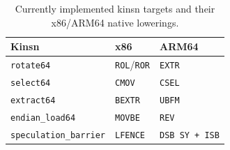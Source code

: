 \begin{table}[t]
\centering
\small
\setlength{\tabcolsep}{4pt}
\begin{tabular}{p{} p{} p{}}
\toprule
\textbf{Kinsn} & \textbf{x86} & \textbf{ARM64} \\
\midrule
\texttt{rotate64} & \texttt{ROL}/\texttt{ROR} & \texttt{EXTR} \\
\texttt{select64} & \texttt{CMOV} & \texttt{CSEL} \\
\texttt{extract64} & \texttt{BEXTR} & \texttt{UBFM} \\
\texttt{endian\_load64} & \texttt{MOVBE} & \texttt{REV} \\
\texttt{speculation\_barrier} & \texttt{LFENCE} & \texttt{DSB SY + ISB} \\
\bottomrule
\end{tabular}
\caption{Currently implemented kinsn targets and their x86/ARM64 native lowerings.}
\label{tab:kinsn-implemented}
\end{table}
